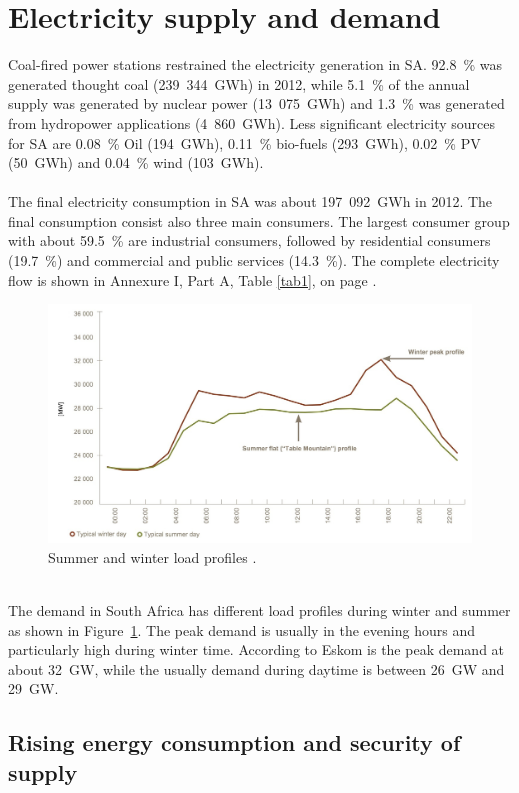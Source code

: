 \documentclass[Master,MEE,english]{twbook}%
\begin{document}
\section{Electricity supply and demand}
Coal-fired power stations restrained the electricity generation in SA. 92.8~\% was generated thought coal (239~344~GWh) in 2012, while 5.1~\% of the annual supply was generated by nuclear power (13~075~GWh) and 1.3~\% was generated from hydropower applications (4~860~GWh). Less significant electricity sources for SA are 0.08~\% Oil (194~GWh), 0.11~\% bio-fuels (293~GWh), 0.02~\% PV (50~GWh) and 0.04~\% wind (103~GWh). \cite{Agency2015}\\
\\
The final electricity consumption in SA was about 197~092~GWh in 2012. The final consumption consist also three main consumers. The largest consumer group with about 59.5~\% are industrial consumers, followed by residential consumers (19.7~\%) and commercial and public services (14.3~\%). The complete electricity flow is shown in Annexure I, Part A, Table \ref{tab1}, on page \pageref{tab1}. \cite{Agency2015}\\
\begin{figure}[!h] %
\centering
\includegraphics[width=0.9\linewidth]{FIG/SummerWinterDemand}
\caption[Summer and winter load profiles.]{Summer and winter load profiles \cite{Eskom2014}.}\label{DEMAND}
\end{figure}
\\
The demand in South Africa has different load profiles during winter and summer as shown in Figure~\ref{DEMAND}. The peak demand is usually in the evening hours and particularly high during winter time. According to Eskom is the peak demand at about 32~GW, while the usually demand during daytime is between 26~GW and 29~GW. \cite{Eskom2014}

\subsection{Rising energy consumption and security of supply}
\end{document}
